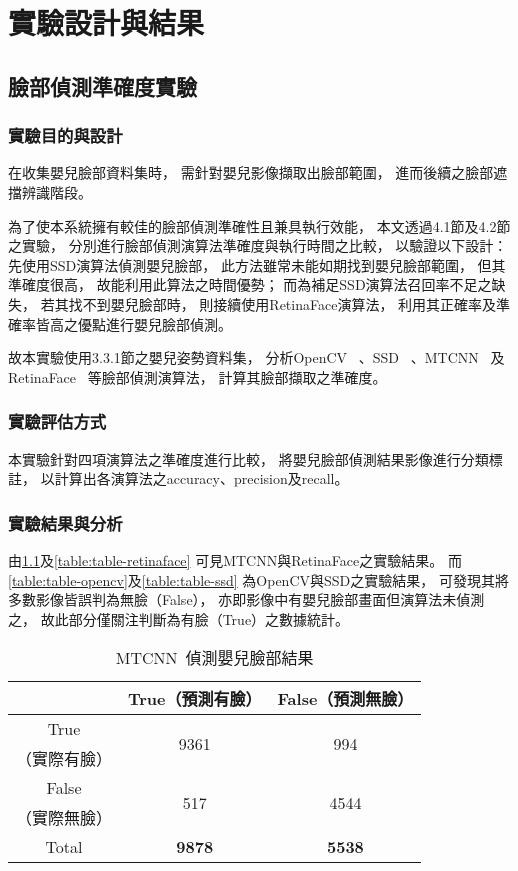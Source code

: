 \documentclass[class=NCU_thesis, crop=false]{standalone}
\begin{document}
\chapter{實驗設計與結果}

\section{臉部偵測準確度實驗}
\subsection{實驗目的與設計}
在收集嬰兒臉部資料集時，
需針對嬰兒影像擷取出臉部範圍，
進而後續之臉部遮擋辨識階段。

為了使本系統擁有較佳的臉部偵測準確性且兼具執行效能，
本文透過4.1節及4.2節之實驗，
分別進行臉部偵測演算法準確度與執行時間之比較，
以驗證以下設計：
先使用SSD演算法偵測嬰兒臉部，
此方法雖常未能如期找到嬰兒臉部範圍，
但其準確度很高，
故能利用此算法之時間優勢；
而為補足SSD演算法召回率不足之缺失，
若其找不到嬰兒臉部時，
則接續使用RetinaFace演算法，
利用其正確率及準確率皆高之優點進行嬰兒臉部偵測。

故本實驗使用3.3.1節之嬰兒姿勢資料集，
分析OpenCV~\cite{goyal_face_2017}
、SSD~\cite{ye_face_2021}
、MTCNN~\cite{zhang_joint_2016}
及RetinaFace~\cite{deng_retinaface_2020}
等臉部偵測演算法，
計算其臉部擷取之準確度。

\subsection{實驗評估方式}
本實驗針對四項演算法之準確度進行比較，
將嬰兒臉部偵測結果影像進行分類標註，
以計算出各演算法之accuracy、precision及recall。

\subsection{實驗結果與分析}
由\cref{table:table-mtcnn}及\cref{table:table-retinaface}
可見MTCNN與RetinaFace之實驗結果。
而\cref{table:table-opencv}及\cref{table:table-ssd}
為OpenCV與SSD之實驗結果，
可發現其將多數影像皆誤判為無臉（False），
亦即影像中有嬰兒臉部畫面但演算法未偵測之，
故此部分僅關注判斷為有臉（True）之數據統計。
\begin{table}[h]
    \centering
    \caption{MTCNN~\cite{zhang_joint_2016}偵測嬰兒臉部結果}
    \label{table:table-mtcnn}
    \begin{tabular}{ccc}
    \hline
     & True（預測有臉）& False（預測無臉）\\
    \hline
    True & \multirow{2}{*}{9361} & \multirow{2}{*}{994} \\
    （實際有臉）& & \\
    False & \multirow{2}{*}{517} & \multirow{2}{*}{4544} \\
    （實際無臉）&  & \\
    \hline
    Total & \textbf{9878} & \textbf{5538} \\
    \hline
    \end{tabular}
\end{table}
\end{document}
